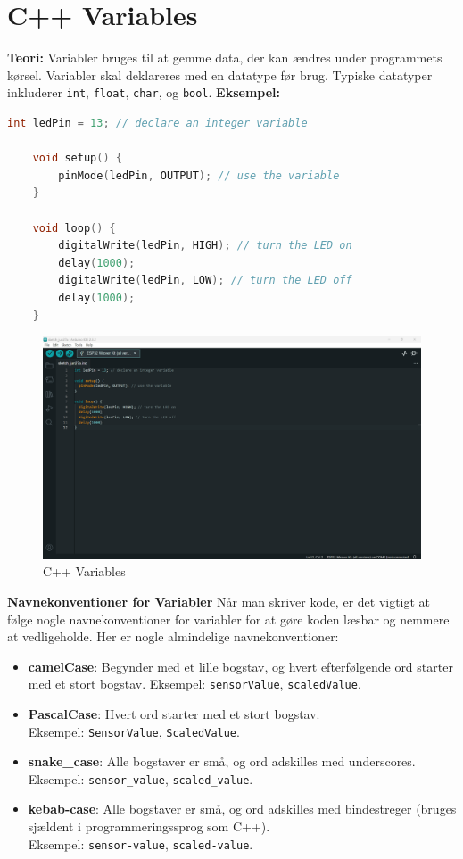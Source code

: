 \section{C++ Variables}
\textbf{Teori:} Variabler bruges til at gemme data, der kan ændres under programmets kørsel. Variabler skal deklareres med en datatype før brug. Typiske datatyper inkluderer \texttt{int}, \texttt{float}, \texttt{char}, og \texttt{bool}.
\clearpage
\noindent\textbf{Eksempel:}
\begin{lstlisting}[language=C++]
	int ledPin = 13; // declare an integer variable
	
	void setup() {
		pinMode(ledPin, OUTPUT); // use the variable
	}
	
	void loop() {
		digitalWrite(ledPin, HIGH); // turn the LED on
		delay(1000);
		digitalWrite(ledPin, LOW); // turn the LED off
		delay(1000);
	}
\end{lstlisting}
\begin{figure}[h!]
	\centering
	\includegraphics[width=\textwidth]{fig/fig3.png}
	\caption{C++ Variables}
	\label{fig:3}
\end{figure}

\noindent\textbf{Navnekonventioner for Variabler}
Når man skriver kode, er det vigtigt at følge nogle navnekonventioner for variabler for at gøre koden læsbar og nemmere at vedligeholde. Her er nogle almindelige navnekonventioner:
\begin{itemize}
	\item \textbf{camelCase}: Begynder med et lille bogstav, og hvert efterfølgende ord starter med et stort bogstav. Eksempel: \texttt{sensorValue}, \texttt{scaledValue}.
	\item \textbf{PascalCase}: Hvert ord starter med et stort bogstav. \\Eksempel: \texttt{SensorValue}, 
	\texttt{ScaledValue}.
	\item \textbf{snake\_case}: Alle bogstaver er små, og ord adskilles med underscores. Eksempel: 
	\texttt{sensor\_value}, \texttt{scaled\_value}.
	\item \textbf{kebab-case}: Alle bogstaver er små, og ord adskilles med bindestreger (bruges sjældent i programmeringssprog som C++). \\Eksempel:
	\texttt{sensor-value}, \texttt{scaled-value}.
\end{itemize}

